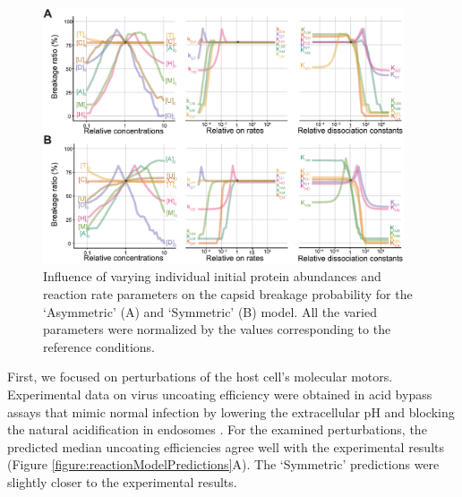 \begin{figure}
\begin{center}
\includegraphics[width=0.95\textwidth, trim={0cm 0cm 0cm 0cm}, clip]{D_chapters/2_ReactionModel/SampledTrajectories.pdf}
\caption[Influence of varying individual initial protein abundances and reaction rate parameters on the capsid breakage probability]%
{Influence of varying individual initial protein abundances and reaction rate parameters on the capsid breakage probability for the ‘Asymmetric’ (A) and ‘Symmetric’ (B) model. All the varied parameters were normalized by the values corresponding to the reference conditions.}
\label{figure:sampledTrajectories}
\end{center}
\end{figure}

First, we focused on perturbations of the host cell’s molecular motors. Experimental data on virus uncoating efficiency were obtained in acid bypass assays that mimic normal infection by lowering the extracellular pH and blocking the natural acidification in endosomes \cite{banerjee2014influenza}. For the examined perturbations, the predicted median uncoating efficiencies agree well with the experimental results (Figure \ref{figure:reactionModelPredictions}A). The ‘Symmetric’ predictions were slightly closer to the experimental results.

